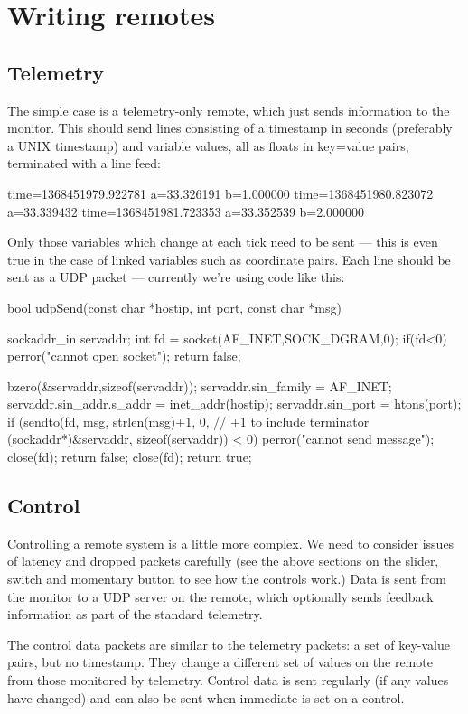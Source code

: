 \section{Writing remotes}
\subsection{Telemetry}
The simple case is a telemetry-only remote, which just sends information to the monitor. This should send lines consisting
of a timestamp in seconds (preferably a UNIX timestamp) and variable values, all as floats in key=value pairs, terminated with
a line feed:
\begin{v}
time=1368451979.922781 a=33.326191 b=1.000000
time=1368451980.823072 a=33.339432
time=1368451981.723353 a=33.352539 b=2.000000
\end{v}
Only those variables which change at each tick need to be sent --- this is even true in the case of linked variables such as coordinate
pairs. Each line should be sent as a UDP packet --- currently we're using code like this:
\begin{v}
bool udpSend(const char *hostip, int port, const char *msg){
    sockaddr_in servaddr;
    int fd = socket(AF_INET,SOCK_DGRAM,0);
    if(fd<0){
        perror("cannot open socket");
        return false;
    }
    
    bzero(&servaddr,sizeof(servaddr));
    servaddr.sin_family = AF_INET;
    servaddr.sin_addr.s_addr = inet_addr(hostip);
    servaddr.sin_port = htons(port);
    if (sendto(fd, msg, strlen(msg)+1, 0, // +1 to include terminator
               (sockaddr*)&servaddr, sizeof(servaddr)) < 0){
        perror("cannot send message");
        close(fd);
        return false;
    }
    close(fd);
    return true;
}
\end{v}

\subsection{Control}
Controlling a remote system is a little more complex. We need to consider issues of latency and dropped packets carefully (see
the above sections on the slider, switch and momentary button to see how the controls work.) Data is sent from the monitor
to a UDP server on the remote, which optionally sends feedback information as part of the standard telemetry.

The control data packets are similar to the telemetry packets: a set of
key-value pairs, but no timestamp. They change a different set of values on
the remote from those monitored by telemetry. Control data is sent regularly
(if any values have changed) and can also be sent when immediate is set on a
control.

